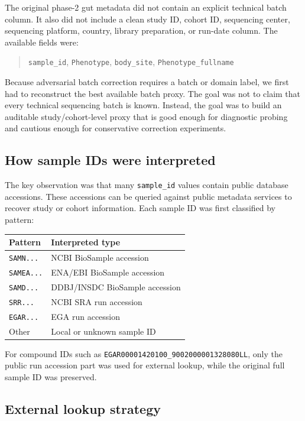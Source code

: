 \documentclass[11pt]{article}
\newcommand{\code}[1]{\texttt{\small #1}}
\begin{document}
The original phase-2 gut metadata did not contain an explicit technical batch column.
It also did not include a clean study ID, cohort ID, sequencing center, sequencing
platform, country, library preparation, or run-date column. The available fields were:

\begin{quote}
\code{sample\_id}, \code{Phenotype}, \code{body\_site}, \code{Phenotype\_fullname}
\end{quote}

Because adversarial batch correction requires a batch or domain label, we first had to
reconstruct the best available batch proxy. The goal was not to claim that every
technical sequencing batch is known. Instead, the goal was to build an auditable
study/cohort-level proxy that is good enough for diagnostic probing and cautious enough
for conservative correction experiments.

\subsection{How sample IDs were interpreted}

The key observation was that many \code{sample\_id} values contain public database
accessions. These accessions can be queried against public metadata services to recover
study or cohort information. Each sample ID was first classified by pattern:

\begin{center}
\begin{tabular}{ll}
\toprule
Pattern & Interpreted type \\
\midrule
\code{SAMN...} & NCBI BioSample accession \\
\code{SAMEA...} & ENA/EBI BioSample accession \\
\code{SAMD...} & DDBJ/INSDC BioSample accession \\
\code{SRR...} & NCBI SRA run accession \\
\code{EGAR...} & EGA run accession \\
Other & Local or unknown sample ID \\
\bottomrule
\end{tabular}
\end{center}

For compound IDs such as \code{EGAR00001420100\_9002000001328080LL}, only the public
run accession part was used for external lookup, while the original full sample ID was
preserved.

\subsection{External lookup strategy}
\end{document}
